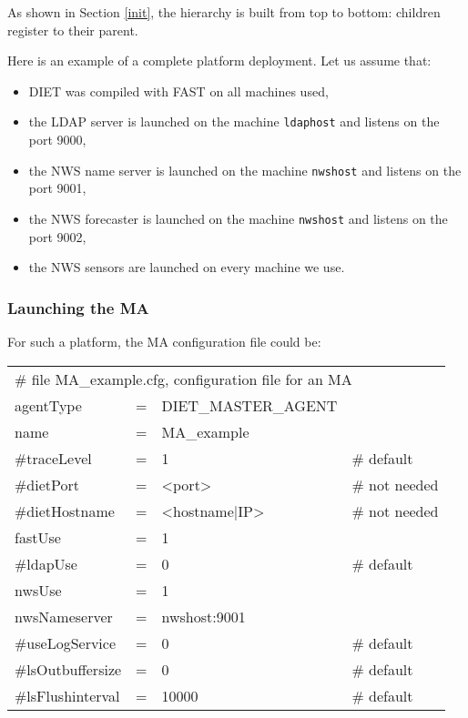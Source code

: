 As shown in Section \ref{init}, the hierarchy is built from top to
bottom: children register to their parent.

Here is an example of a complete platform deployment. Let us assume
that:

\begin{itemize}
\item DIET was compiled with FAST on all machines used,
\item the LDAP server is launched on the machine \texttt{ldaphost} and listens
  on the port 9000,
\item the NWS name server is launched on the machine \texttt{nwshost} and
  listens on the port 9001,
\item the NWS forecaster is launched on the machine \texttt{nwshost} and
  listens on the port 9002,
\item the NWS sensors are launched on every machine we use.
\end{itemize}


\subsubsection{Launching the MA}

For such a platform, the MA configuration file could be:
\tt
\begin{center}
 \footnotesize
 \begin{tabular}{lcll}
  \multicolumn{4}{l}{\# file MA\_example.cfg, configuration file for an MA}\\
  agentType     &=&DIET\_MASTER\_AGENT&\\
  name          &=&MA\_example        &\\
  \#traceLevel  &=&1                  &\# default\\
  \#dietPort    &=&<port>             &\# not needed\\
  \#dietHostname&=&<hostname|IP>      &\# not needed\\
  fastUse       &=&1                  &\\
  \#ldapUse     &=&0                  &\# default\\
  nwsUse        &=&1                  &\\
  nwsNameserver &=&nwshost:9001       &\\
  \#useLogService &=& 0               &\# default\\
  \#lsOutbuffersize &=& 0             &\# default\\
  \#lsFlushinterval &=& 10000           &\# default\\
 \end{tabular}
\end{center}
\rm

